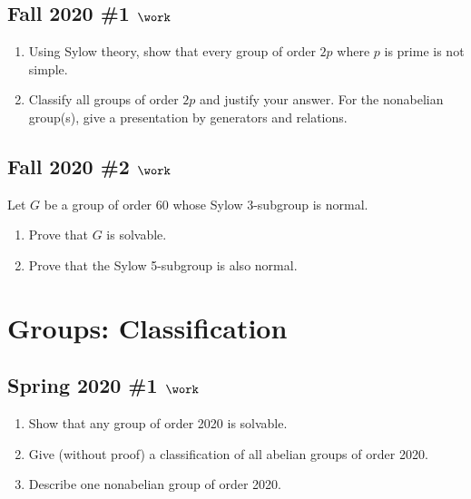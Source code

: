 \hypertarget{fall-2020-1-work}{%
\subsection{\texorpdfstring{Fall 2020 \#1
\(\work\)}{Fall 2020 \#1 \textbackslash work}}\label{fall-2020-1-work}}

\begin{enumerate}
\def\labelenumi{\alph{enumi}.}
\item
  Using Sylow theory, show that every group of order \(2p\) where \(p\)
  is prime is not simple.
\item
  Classify all groups of order \(2p\) and justify your answer. For the
  nonabelian group(s), give a presentation by generators and relations.
\end{enumerate}

\hypertarget{fall-2020-2-work}{%
\subsection{\texorpdfstring{Fall 2020 \#2
\(\work\)}{Fall 2020 \#2 \textbackslash work}}\label{fall-2020-2-work}}

Let \(G\) be a group of order 60 whose Sylow 3-subgroup is normal.

\begin{enumerate}
\def\labelenumi{\alph{enumi}.}
\item
  Prove that \(G\) is solvable.
\item
  Prove that the Sylow 5-subgroup is also normal.
\end{enumerate}

\hypertarget{groups-classification}{%
\section{Groups: Classification}\label{groups-classification}}

\hypertarget{spring-2020-1-work}{%
\subsection{\texorpdfstring{Spring 2020 \#1
\(\work\)}{Spring 2020 \#1 \textbackslash work}}\label{spring-2020-1-work}}

\begin{enumerate}
\def\labelenumi{\alph{enumi}.}
\item
  Show that any group of order 2020 is solvable.
\item
  Give (without proof) a classification of all abelian groups of order
  2020.
\item
  Describe one nonabelian group of order 2020.
\end{enumerate}

